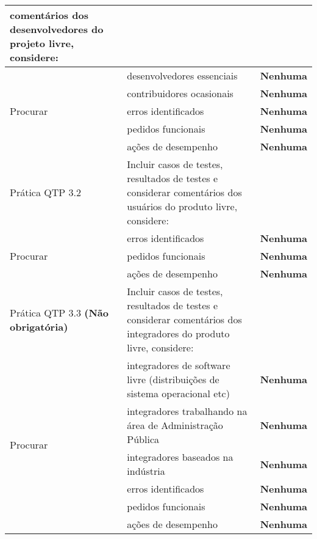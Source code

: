\begin{longtable}{|p{2cm}|p{7cm}|p{7cm}|}
  comentários dos desenvolvedores do projeto livre, considere: & \\
  \hline \multirow{5}{*}{Procurar} & desenvolvedores essenciais &
  \textbf{Nenhuma} \\
  \cline{2-3} & contribuidores ocasionais & \textbf{Nenhuma} \\
  \cline{2-3} & erros identificados & \textbf{Nenhuma} \\
  \cline{2-3} & pedidos funcionais & \textbf{Nenhuma} \\
  \cline{2-3} & ações de desempenho & \textbf{Nenhuma} \\
  \hline \cellcolor[gray]{0.9} Prática QTP 3.2 & \cellcolor[gray]{0.9}
  Incluir casos de testes, resultados de testes e considerar
  comentários dos usuários do produto livre, considere: & \\
  \hline \multirow{3}{*}{Procurar} & erros identificados &
  \textbf{Nenhuma} \\
  \cline{2-3} & pedidos funcionais & \textbf{Nenhuma} \\
  \cline{2-3} & ações de desempenho & \textbf{Nenhuma} \\
  \hline \cellcolor[gray]{0.9} Prática QTP 3.3 \textbf{(Não
    obrigatória)} & \cellcolor[gray]{0.9} Incluir casos de testes,
  resultados de testes e considerar
  comentários dos integradores do produto livre, considere: & \\
  \hline \multirow{6}{*}{Procurar} & integradores de software livre
  (distribuições de sistema operacional etc) &
  \textbf{Nenhuma} \\
  \cline{2-3} & integradores trabalhando na área de Administração Pública & \textbf{Nenhuma} \\
  \cline{2-3} & integradores baseados na indústria & \textbf{Nenhuma}
  \\
  \cline{2-3} & erros identificados & \textbf{Nenhuma} \\
  \cline{2-3} & pedidos funcionais & \textbf{Nenhuma} \\
  \cline{2-3} & ações de desempenho & \textbf{Nenhuma} \\
  \hline
\end{longtable}

